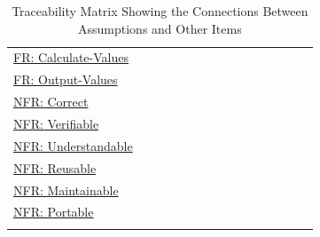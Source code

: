 \documentclass[12pt]{article}
\begin{document}
\begin{longtable}{l l l l l l l l l l l l l l l}
\hyperref[calcValues]{FR: Calculate-Values} &  &  &  &  &  &  &  &  &  &  &  &  &  & 
\\
\hyperref[outputValues]{FR: Output-Values} &  &  &  &  &  &  &  &  &  &  &  &  &  & 
\\
\hyperref[correct]{NFR: Correct} &  &  &  &  &  &  &  &  &  &  &  &  &  & 
\\
\hyperref[verifiable]{NFR: Verifiable} &  &  &  &  &  &  &  &  &  &  &  &  &  & 
\\
\hyperref[understandable]{NFR: Understandable} &  &  &  &  &  &  &  &  &  &  &  &  &  & 
\\
\hyperref[reusable]{NFR: Reusable} &  &  &  &  &  &  &  &  &  &  &  &  &  & 
\\
\hyperref[maintainable]{NFR: Maintainable} &  &  &  &  &  &  &  &  &  &  &  &  &  & 
\\
\hyperref[portable]{NFR: Portable} &  &  &  &  &  &  &  &  &  &  &  &  &  & 
\\
\bottomrule
\caption{Traceability Matrix Showing the Connections Between Assumptions and Other Items}
\label{Table:TraceMatAvsAll}
\end{longtable}
\end{document}
